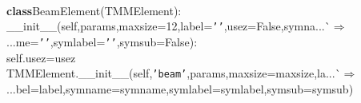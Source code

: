 {{\begin{tabbing}
\\
{\textbf{class}}\hspace{5pt}BeamElement(TMMElement):
\\
\hspace{5pt}\_\_init\_\_(self,params,maxsize=12,label={\texttt{{'}{'}}},usez=False,symna{}...\`$\Rightarrow$\\
...{}me={\texttt{{'}{'}}},symlabel={\texttt{{'}{'}}},symsub=False):
\\
\hspace{40pt}self.usez=usez
\\
\hspace{40pt}TMMElement.\_\_init\_\_(self,{\texttt{{'}beam{'}}},params,maxsize=maxsize,la{}...\`$\Rightarrow$\\
...{}bel=label,symname=symname,symlabel=symlabel,symsub=symsub)
\\


\end{tabbing}}}
